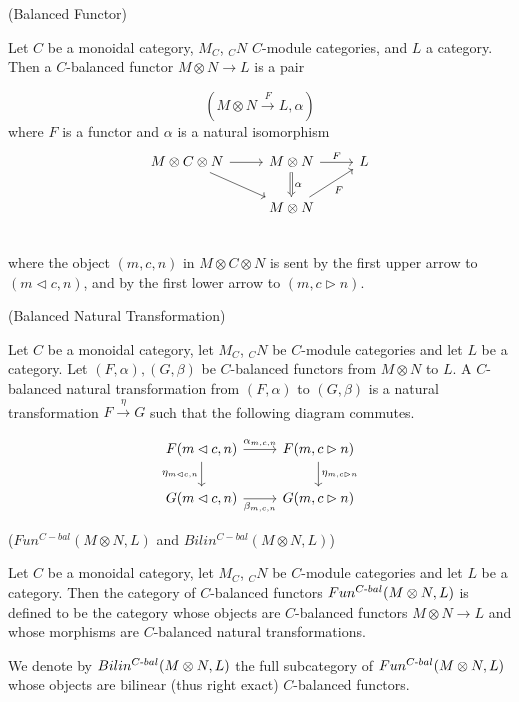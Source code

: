 \begin{definition} (Balanced Functor)

  \noindent Let $C$ be a monoidal category, $M_{C}$, $_{C}N$ $C$-module
  categories, and $L$ a category. \quad Then a $C$-balanced functor $M \otimes
  N\to L$ is a pair

  \[(M \otimes N \xrightarrow{F} L, \alpha)\]
  where $F$ is a functor and $\alpha$ is a natural isomorphism
  \[
    \begin{tikzcd}
      M \otimes C \otimes N \arrow[r] \arrow[dr] &
      M \otimes N \arrow[d, Rightarrow, "\alpha"] \arrow[r, "F"] &
      L \\
      & M \otimes N \arrow[ur, "F"'] \\
    \end{tikzcd}
  \]
  where the object $(m,c,n)$ in $M \otimes C \otimes N$ is sent by the first
  upper arrow to $(m \lhd c, n)$, and by the first lower arrow to $(m, c \rhd n)$.
\end{definition}

\begin{definition} (Balanced Natural Transformation)

  \noindent Let $C$ be a monoidal category, let $M_{C}$, $_{C}N$ be $C$-module
  categories and let $L$ be a category. Let $(F,\alpha), (G,\beta)$ be
  $C$-balanced functors from $M \otimes N$ to $L$. A $C$-balanced natural
  transformation from $(F,\alpha)$ to $(G,\beta)$ is a natural transformation
  $ F \xrightarrow{\eta} G$ such that the following diagram commutes.

  \[
    \begin{tikzcd}
      F(m \lhd c, n) \arrow[r, "\alpha_{m,c,n}"] \arrow[d, "\eta_{m \lhd c, n}"'] &
      F(m, c \rhd n) \arrow[d, "\eta_{m, c \rhd n}"] \\
      G(m \lhd c, n) \arrow[r, "\beta_{m,c,n}"'] &
      G(m, c \rhd n)
    \end{tikzcd}
  \]
\end{definition}

\begin{definition} ($Fun^{C-bal}(M \otimes N, L)$ and $Bilin^{C-bal}(M \otimes N, L)$)

  \noindent Let $C$ be a monoidal category, let $M_{C}$, $_{C}N$ be $C$-module
  categories and let $L$ be a category. \quad Then the category of
  $C$-balanced functors $Fun^{C{\text -}bal}(M \otimes N, L)$ is defined to be
  the category whose objects are $C$-balanced functors $M \otimes N \to L$ and
  whose morphisms are $C$-balanced natural transformations.

  We denote by $Bilin^{C{\text -}bal}(M \otimes N, L)$ the full subcategory of
  $Fun^{C{\text -}bal}(M \otimes N, L)$ whose objects are bilinear (thus right
  exact) $C$-balanced functors.
\end{definition}


